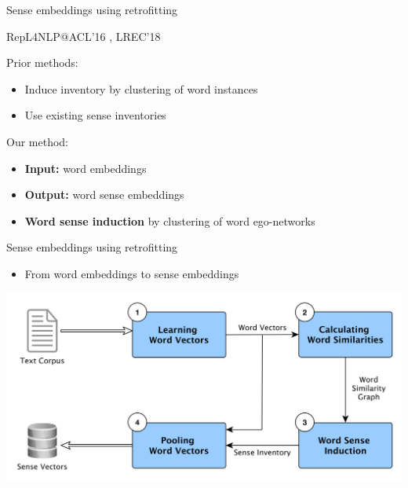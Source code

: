 \documentclass{beamer}
\begin{document}
\begin{frame}{Sense embeddings using retrofitting}
	
	 {\footnotesize RepL4NLP@ACL'16 \cite{pelevina-EtAl:2016:RepL4NLP}, LREC'18 \cite{remus:2018}}
	
	\begin{block}{Prior methods:}
		\vspace{0.25cm}

	\begin{itemize}	
	\item Induce inventory by \alert{clustering of word instances} %
	\item Use \alert{existing} sense inventories %
	\end{itemize}
\end{block}


	\begin{block}{Our method:}
		\vspace{0.25cm}

	\begin{itemize}	
	\item \textbf{Input:} word embeddings
	\item \textbf{Output:} word sense embeddings
	\item \textbf{Word sense induction} by \alert{clustering of word ego-networks}

	\end{itemize}
\end{block}


\end{frame}

\begin{frame}{Sense embeddings using retrofitting}
\begin{itemize}
\item From word embeddings to sense embeddings
\end{itemize}
\includegraphics[width=\textwidth]{pipeline}

\end{frame}
\end{document}
